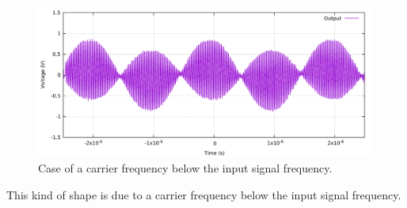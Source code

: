 \documentclass[12pt,oneside]{article}
\begin{document}
\begin{figure}[!h!tb]
	\begin{center}
		\includegraphics[width=14cm]{scope/Mod_amplPasOkV1.pdf}
		\caption{Case of a carrier frequency below the input signal frequency.}
		\label{fig:ampleModV14}
	\end{center}
\end{figure}

This kind of shape is due to a carrier frequency below the input signal frequency. 
 
\end{document}
